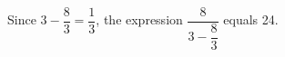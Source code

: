 Since $3 - \dfrac{8}{3} = \dfrac{1}{3}$, the expression $\boxed{\dfrac{8}{3 - \dfrac{8}{3}}}$ equals 24.
